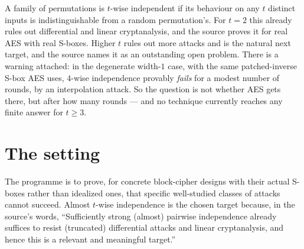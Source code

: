 \documentclass{conjura-conjecture}
\begin{document}

\vspace{0.4em}

\begin{informalconjecture}
A family of permutations is $t$-wise independent if its behaviour on any
$t$ distinct inputs is indistinguishable from a random permutation's.
For $t = 2$ this already rules out differential and linear cryptanalysis,
and the source proves it for real AES with real S-boxes. Higher $t$ rules
out more attacks and is the natural next target, and the source names it
as an outstanding open problem. There is a warning attached: in the
degenerate width-$1$ case, with the same patched-inverse S-box AES uses,
$4$-wise independence provably \emph{fails} for a modest number of
rounds, by an interpolation attack. So the question is not whether AES
gets there, but after how many rounds --- and no technique currently
reaches any finite answer for $t \ge 3$.
\end{informalconjecture}

\section{The setting}\label{sec:setting}

The programme is to prove, for concrete block-cipher designs with their
actual S-boxes rather than idealized ones, that specific well-studied
classes of attacks cannot succeed. Almost $t$-wise independence is the
chosen target because, in the source's words, ``Sufficiently strong
(almost) pairwise independence already suffices to resist (truncated)
differential attacks and linear cryptanalysis, and hence this is a
relevant and meaningful target.''
\end{document}
